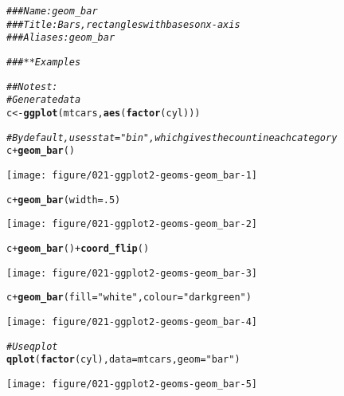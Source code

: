 \documentclass[a4paper,titlepage]{tufte-handout}\usepackage[]{graphicx}\usepackage[]{color}
\makeatletter
\def\maxwidth{ %
  \ifdim\Gin@nat@width>\linewidth
    \linewidth
  \else
    \Gin@nat@width
  \fi
}
\newcommand{\hlnum}[1]{\textcolor[rgb]{0.686,0.059,0.569}{#1}}%
\newcommand{\hlstr}[1]{\textcolor[rgb]{0.192,0.494,0.8}{#1}}%
\newcommand{\hlcom}[1]{\textcolor[rgb]{0.678,0.584,0.686}{\textit{#1}}}%
\newcommand{\hlopt}[1]{\textcolor[rgb]{0,0,0}{#1}}%
\newcommand{\hlstd}[1]{\textcolor[rgb]{0.345,0.345,0.345}{#1}}%
\newcommand{\hlkwb}[1]{\textcolor[rgb]{0.69,0.353,0.396}{#1}}%
\newcommand{\hlkwc}[1]{\textcolor[rgb]{0.333,0.667,0.333}{#1}}%
\newcommand{\hlkwd}[1]{\textcolor[rgb]{0.737,0.353,0.396}{\textbf{#1}}}%
\newenvironment{kframe}{%
 \def\at@end@of@kframe{}%
 \ifinner\ifhmode%
  \def\at@end@of@kframe{\end{minipage}}%
  \begin{minipage}{\columnwidth}%
 \fi\fi%
 \def\FrameCommand##1{\hskip\@totalleftmargin \hskip-\fboxsep
 \colorbox{shadecolor}{##1}\hskip-\fboxsep
     \hskip-\linewidth \hskip-\@totalleftmargin \hskip\columnwidth}%
 \MakeFramed {\advance\hsize-\width
   \@totalleftmargin\z@ \linewidth\hsize
   \@setminipage}}%
 {\par\unskip\endMakeFramed%
 \at@end@of@kframe}
\newenvironment{knitrout}{}{} %
\makeatother
\begin{document}
\begin{knitrout}
\color{fgcolor}\begin{kframe}
\begin{alltt}
\hlcom{### Name: geom_bar}
\hlcom{### Title: Bars, rectangles with bases on x-axis}
\hlcom{### Aliases: geom_bar}

\hlcom{### ** Examples}

\hlcom{## No test: }
\hlcom{# Generate data}
\hlstd{c} \hlkwb{<-} \hlkwd{ggplot}\hlstd{(mtcars,} \hlkwd{aes}\hlstd{(}\hlkwd{factor}\hlstd{(cyl)))}

\hlcom{# By default, uses stat="bin", which gives the count in each category}
\hlstd{c} \hlopt{+} \hlkwd{geom_bar}\hlstd{()}
\end{alltt}
\end{kframe}
\texttt{[image: figure/021-ggplot2-geoms-geom\_bar-1]} 
\begin{kframe}\begin{alltt}
\hlstd{c} \hlopt{+} \hlkwd{geom_bar}\hlstd{(}\hlkwc{width}\hlstd{=}\hlnum{.5}\hlstd{)}
\end{alltt}
\end{kframe}
\texttt{[image: figure/021-ggplot2-geoms-geom\_bar-2]} 
\begin{kframe}\begin{alltt}
\hlstd{c} \hlopt{+} \hlkwd{geom_bar}\hlstd{()} \hlopt{+} \hlkwd{coord_flip}\hlstd{()}
\end{alltt}
\end{kframe}
\texttt{[image: figure/021-ggplot2-geoms-geom\_bar-3]} 
\begin{kframe}\begin{alltt}
\hlstd{c} \hlopt{+} \hlkwd{geom_bar}\hlstd{(}\hlkwc{fill}\hlstd{=}\hlstr{"white"}\hlstd{,} \hlkwc{colour}\hlstd{=}\hlstr{"darkgreen"}\hlstd{)}
\end{alltt}
\end{kframe}
\texttt{[image: figure/021-ggplot2-geoms-geom\_bar-4]} 
\begin{kframe}\begin{alltt}
\hlcom{# Use qplot}
\hlkwd{qplot}\hlstd{(}\hlkwd{factor}\hlstd{(cyl),} \hlkwc{data}\hlstd{=mtcars,} \hlkwc{geom}\hlstd{=}\hlstr{"bar"}\hlstd{)}
\end{alltt}
\end{kframe}
\texttt{[image: figure/021-ggplot2-geoms-geom\_bar-5]} 
\begin{kframe}\begin{alltt}

\end{alltt}
\end{kframe}
\end{knitrout}
\end{document}

